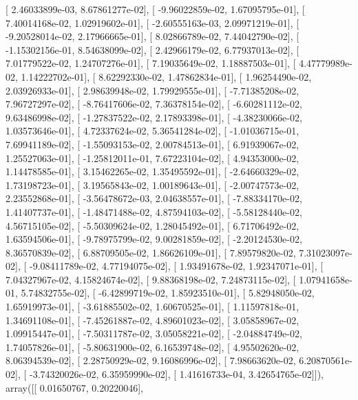 \documentclass{article}
\begin{document}
       [  2.46033899e-03,   8.67861277e-02],
       [ -9.96022859e-02,   1.67095795e-01],
       [  7.40014168e-02,   1.02919602e-01],
       [ -2.60555163e-03,   2.09971219e-01],
       [ -9.20528014e-02,   2.17966665e-01],
       [  8.02866789e-02,   7.44042790e-02],
       [ -1.15302156e-01,   8.54638099e-02],
       [  2.42966179e-02,   6.77937013e-02],
       [  7.01779522e-02,   1.24707276e-01],
       [  7.19035649e-02,   1.18887503e-01],
       [  4.47779989e-02,   1.14222702e-01],
       [  8.62292330e-02,   1.47862834e-01],
       [  1.96254490e-02,   2.03926933e-01],
       [  2.98639948e-02,   1.79929555e-01],
       [ -7.71385208e-02,   7.96727297e-02],
       [ -8.76417606e-02,   7.36378154e-02],
       [ -6.60281112e-02,   9.63486998e-02],
       [ -1.27837522e-02,   2.17893398e-01],
       [ -4.38230066e-02,   1.03573646e-01],
       [  4.72337624e-02,   5.36541284e-02],
       [ -1.01036715e-01,   7.69941189e-02],
       [ -1.55093153e-02,   2.00784513e-01],
       [  6.91939067e-02,   1.25527063e-01],
       [ -1.25812011e-01,   7.67223104e-02],
       [  4.94353000e-02,   1.14478585e-01],
       [  3.15462265e-02,   1.35495592e-01],
       [ -2.64660329e-02,   1.73198723e-01],
       [  3.19565843e-02,   1.00189643e-01],
       [ -2.00747573e-02,   2.23552868e-01],
       [ -3.56478672e-03,   2.04638557e-01],
       [ -7.88334170e-02,   1.41407737e-01],
       [ -1.48471488e-02,   4.87594103e-02],
       [ -5.58128440e-02,   4.56715105e-02],
       [ -5.50309624e-02,   1.28045492e-01],
       [  6.71706492e-02,   1.63594506e-01],
       [ -9.78975799e-02,   9.00281859e-02],
       [ -2.20124530e-02,   8.36570839e-02],
       [  6.88709505e-02,   1.86626109e-01],
       [  7.89579820e-02,   7.31023097e-02],
       [ -9.08411789e-02,   4.77194075e-02],
       [  1.93491678e-02,   1.92347071e-01],
       [  7.04327967e-02,   4.15824674e-02],
       [  9.88368198e-02,   7.24873115e-02],
       [  1.07941658e-01,   5.74832755e-02],
       [ -6.42899719e-02,   1.85923510e-01],
       [  5.82948050e-02,   1.65919973e-01],
       [ -3.61885502e-02,   1.60670525e-01],
       [  1.11597818e-01,   1.34691108e-01],
       [ -7.45261887e-02,   4.89601023e-02],
       [  3.05858967e-02,   1.09915447e-01],
       [ -7.50311787e-02,   3.05058221e-02],
       [ -2.04884749e-02,   1.74057826e-01],
       [ -5.80631900e-02,   6.16539748e-02],
       [  4.95502620e-02,   8.06394539e-02],
       [  2.28750929e-02,   9.16086996e-02],
       [  7.98663620e-02,   6.20870561e-02],
       [ -3.74320026e-02,   6.35959990e-02],
       [  1.41616733e-04,   3.42654765e-02]]), array([[ 0.01650767,  0.20220046],
\end{document}
